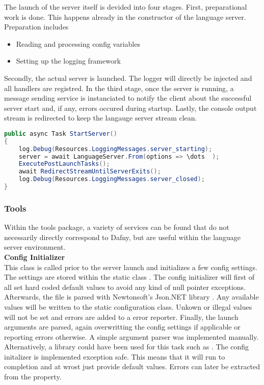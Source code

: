 The launch of the server itself is devided into four stages.
First, preparational work is done.
This happens already in the constructor of the language server.
Preparation includes
\begin{itemize}
    \item Reading and processing config variables
    \item Setting up the logging framework
\end{itemize}
Secondly, the actual server is launched.
The logger will directly be injected and all handlers are registred.
In the third stage, once the server is running, a message sending service is instanciated to notify the client about the successful server start and, if any, errors occured during startup.
Lastly, the console output stream is redirected to keep the langauge server stream clean.

\begin{lstlisting}[language=csharp, caption={Starting the Language Server}, captionpos=b, label={lst:serverstart}]
public async Task StartServer()
{
    log.Debug(Resources.LoggingMessages.server_starting);
    server = await LanguageServer.From(options => \dots  );
    ExecutePostLaunchTasks();
    await RedirectStreamUntilServerExits();
    log.Debug(Resources.LoggingMessages.server_closed);
}
\end{lstlisting}

\subsubsection{Tools}
Within the tools package, a variety of services can be found that do not necessarily directly correspond to Dafny, but are useful within the language server environment.\\

\textbf{Config Initializer}\\
This class is called prior to the server launch and initializes a few config settings.
The settings are stored within the static class .
The config initializer will first of all set hard coded default values to avoid any kind of null pointer exceptions.
Afterwards, the file  is parsed with Newtonsoft's Json.NET library \cite{jsondotnet}.
Any available values will be written to the static configuration class.
Unkown or illegal values will not be set and errors are added to a error reporter.
Finally, the launch arguments are parsed, again overwritting the config settings if applicable or reporting errors otherwise.
A simple argument parser was implemented manually.
Alternatively, a library could have been used for this task such as \cite{clparser}.
The config initalizer is implemented exception safe.
This means that it will run to completion and at wrost just provide default values.
Errors can later be extracted from the  property.\\

